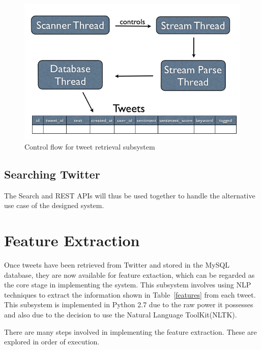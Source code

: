 \begin{figure}[t]
\begin{center}
\includegraphics[width=12cm]{tweetir}
\end{center}
\caption{Control flow for tweet retrieval subsystem}
\label{fig:tweetir}
\end{figure}




\subsection{Searching Twitter}
The Search and REST APIs will thus be used together to handle the alternative use case of the designed system.




\section{Feature Extraction}
Once tweets have been retrieved from Twitter and stored in the MySQL database, they are now available for feature extaction, which can be regarded as the core stage in implementing the system. This subsystem involves using NLP techniques to extract the information shown in Table~\ref{features} from each tweet. This subsystem is implemented in Python 2.7 due to the raw power it possesses and also due to the decision to use the Natural Language ToolKit(NLTK)\cite{NLTK}.

There are many steps involved in implementing the feature extraction. These are explored in order of execution.

